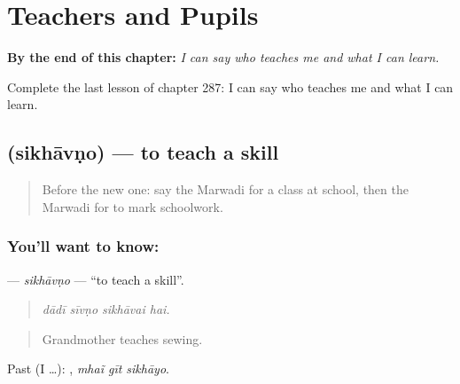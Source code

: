 
\chapter{Teachers and Pupils}
\label{ch:mw-teachers-and-pupils}

\begin{chapteropening}
\textbf{By the end of this chapter:} \emph{I can say who teaches me and what I can learn.}

Complete the last lesson of chapter 287: I can say who teaches me and what I can learn.
\end{chapteropening}

\section[\texorpdfstring{\mw{सिखावणो} (sikhāvṇo)}{सिखावणो (sikhāvṇo)}]{ (sikhāvṇo) — to teach a skill}

\label{lesson:MW-C287-sikhavno}



\begin{quote}
Before the new one: say the Marwadi for a class at school, then the Marwadi for to mark schoolwork.
\end{quote}

\subsection*{You'll want to know: }
\textbf{} — \emph{sikhāvṇo} — \textquotedblleft{}to teach a skill\textquotedblright{}.

\begin{quote}
   
\end{quote}

\begin{quote}
\emph{dādī sīvṇo sikhāvai hai.}
\end{quote}

\begin{quote}
Grandmother teaches sewing.
\end{quote}

Past (I …):   , \emph{mhaĩ gīt sikhāyo}.


